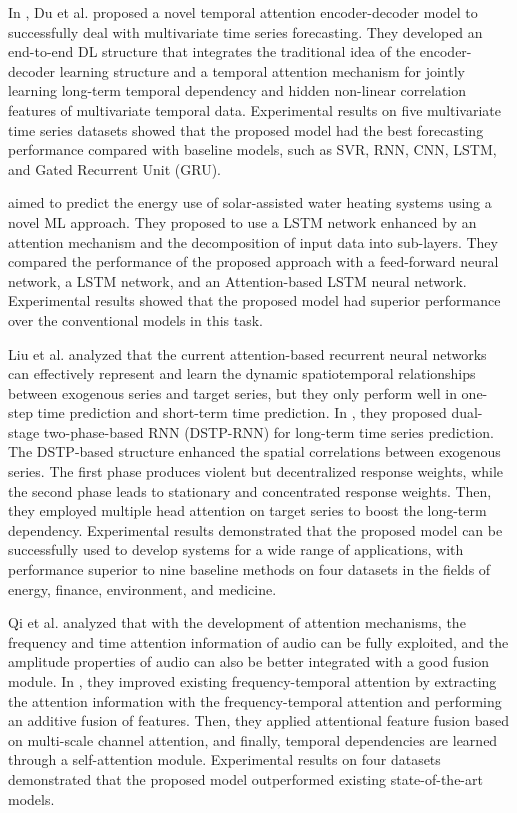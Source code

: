 In \cite{DU2020269}, Du et al. proposed a novel temporal attention encoder-decoder model to successfully deal with multivariate time series forecasting.
They developed an end-to-end DL structure that integrates the traditional idea of the encoder-decoder learning structure and a temporal attention mechanism for jointly learning long-term temporal dependency and hidden non-linear correlation features of multivariate temporal data.
Experimental results on five multivariate time series datasets showed that the proposed model had the best forecasting performance compared with baseline models, such as SVR, RNN, CNN, LSTM, and Gated Recurrent Unit (GRU).

\cite{HEIDARI2020626} aimed to predict the energy use of solar-assisted water heating systems using a novel ML approach.
They proposed to use a LSTM network enhanced by an attention mechanism and the decomposition of input data into sub-layers.
They compared the performance of the proposed approach with a feed-forward neural network, a LSTM network, and an Attention-based LSTM neural network.
Experimental results showed that the proposed model had superior performance over the conventional models in this task.

Liu et al. analyzed that the current attention-based recurrent neural networks can effectively represent and learn the dynamic spatiotemporal relationships between exogenous series and target series, but they only perform well in one-step time prediction and short-term time prediction.
In \cite{LIU2020113082}, they proposed dual-stage two-phase-based RNN (DSTP-RNN) for long-term time series prediction.
The DSTP-based structure enhanced the spatial correlations between exogenous series.
The first phase produces violent but decentralized response weights, while the second phase leads to stationary and concentrated response weights.
Then, they employed multiple head attention on target series to boost the long-term dependency.
Experimental results demonstrated that the proposed model can be successfully used to develop systems for a wide range of applications, with performance superior to nine baseline methods on four datasets in the fields of energy, finance, environment, and medicine.

Qi et al. analyzed that with the development of attention mechanisms, the frequency and time attention information of audio can be fully exploited, and the amplitude properties of audio can also be better integrated with a good fusion module.
In \cite{10019616}, they improved existing frequency-temporal attention by extracting the attention information with the frequency-temporal attention and performing an additive fusion of features.
Then, they applied attentional feature fusion based on multi-scale channel attention, and finally, temporal dependencies are learned through a self-attention module.
Experimental results on four datasets demonstrated that the proposed model outperformed existing state-of-the-art models.

